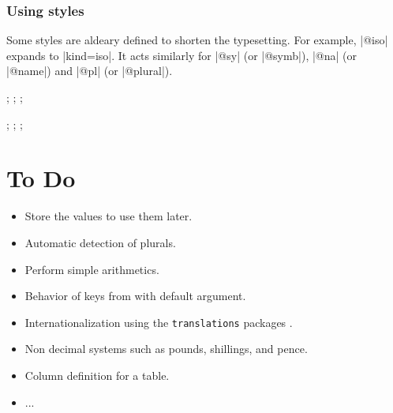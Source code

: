 \documentclass[12pt,add-index]{cnltx-doc}
\begin{document}
\subsubsection{Using styles}

Some styles are aldeary defined to shorten the typesetting. 
For example, \verbcode|@iso| expands to \verbcode|kind=iso|.
It
acts similarly for \verbcode|@sy| (or \verbcode|@symb|), \verbcode|@na| (or \verbcode|@name|) and \verbcode|@pl|
(or \verbcode|@plural|).

\begin{example}
    ; ; ; 

     ;  ;  ; 
\end{example}







\section{To Do}

\begin{itemize}
    \item Store the values to use them later. 
    \item Automatic detection of plurals.
    \item Perform simple arithmetics.
    \item Behavior of  keys from  with default argument.
    \item Internationalization using the \texttt{translations} packages \cite{translations}.
    \item Non decimal systems such as pounds, shillings, and pence.
    \item Column definition for a table.
    \item ...
\end{itemize}


\printbibliography
\end{document}
